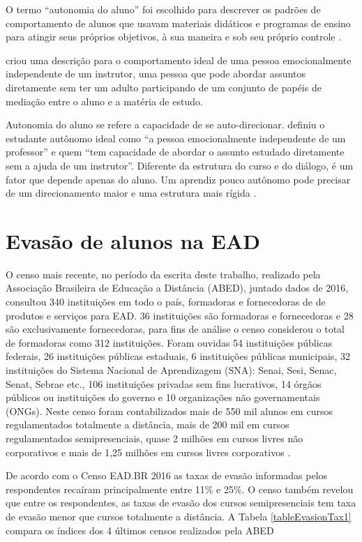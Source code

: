 O termo ``autonomia do aluno'' foi escolhido para descrever os padrões de
comportamento de alunos que usavam materiais didáticos e programas de ensino
para atingir seus próprios objetivos, à sua maneira e sob seu próprio controle
\cite{moore2008teoria}.

 criou uma descrição para o
comportamento ideal de uma pessoa emocionalmente independente de um instrutor,
uma pessoa que pode abordar assuntos diretamente sem ter um adulto participando
de um conjunto de papéis de mediação entre o aluno e a matéria de estudo.

Autonomia do aluno  se refere a capacidade de se auto-direcionar.
 definiu o estudante autônomo ideal como ``a
pessoa emocionalmente independente de um professor'' e quem ``tem capacidade de
abordar o assunto estudado diretamente sem a ajuda de um instrutor''. Diferente
da estrutura do curso e do diálogo, é um fator que depende apenas do aluno. Um
aprendiz pouco autônomo pode precisar de um direcionamento maior e uma estrutura
mais rígida \cite{huang2016understanding}.

\section{Evasão de alunos na EAD}

O censo mais recente, no período da escrita deste trabalho, realizado pela
Associação Brasileira de Educação a Distância (ABED), juntado dados de 2016,
consultou 340 instituições em todo o país, formadoras e fornecedoras de de
produtos e serviços para EAD. 36 instituições são formadoras e fornecedoras e 28
são exclusivamente fornecedoras, para fins de análise o censo considerou o total
de formadoras como 312 instituições. Foram ouvidas 54 instituições públicas
federais, 26 instituições públicas estaduais, 6 instituições públicas
municipais, 32 instituições do Sistema Nacional de Aprendizagem (SNA): Senai,
Sesi, Senac, Senat, Sebrae etc., 106 instituições privadas sem fins lucrativos,
14 órgãos públicos ou instituições do governo e 10 organizações não
governamentais (ONGs). Neste censo foram contabilizados mais de 550 mil alunos
em cursos regulamentados totalmente a distância, mais de 200 mil em cursos
regulamentados semipresenciais,  quase 2 milhões em cursos livres não
corporativos e mais de 1,25 milhões em cursos livres corporativos
\cite{abed2016ead}.

De acordo com o Censo EAD.BR 2016 as taxas de evasão informadas pelos
respondentes recaíram principalmente entre 11\% e 25\%. O censo também revelou
que entre os respondentes, as taxas de evasão dos cursos semipresenciais tem
taxa de evasão menor que cursos totalmente a distância. A Tabela
\ref{tableEvasionTax1} compara os índices dos 4 últimos censos realizados pela
ABED
\cite{abed2013ead,abed2014ead,abed2015ead,abed2016ead}

